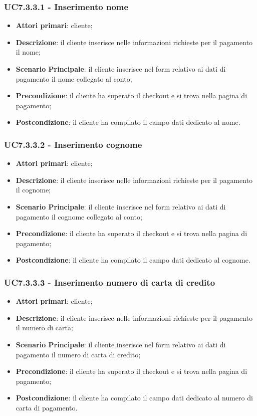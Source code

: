 \subsubsection{UC7.3.3.1 - Inserimento nome}
\begin{itemize}
\item \textbf{Attori primari}: cliente;
\item \textbf{Descrizione}: il cliente inserisce nelle informazioni richieste per il pagamento il nome;
\item \textbf{Scenario Principale}: il cliente inserisce nel form relativo ai dati di pagamento il nome collegato al conto;
\item \textbf{Precondizione}: il cliente ha superato il checkout e si trova nella pagina di pagamento;
\item \textbf{Postcondizione}: il cliente ha compilato il campo dati dedicato al nome.
\end{itemize}

\subsubsection{UC7.3.3.2 - Inserimento cognome}
\begin{itemize}
\item \textbf{Attori primari}: cliente;
\item \textbf{Descrizione}: il cliente inserisce nelle informazioni richieste per il pagamento il cognome;
\item \textbf{Scenario Principale}: il cliente inserisce nel form relativo ai dati di pagamento il cognome collegato al conto;
\item \textbf{Precondizione}: il cliente ha superato il checkout e si trova nella pagina di pagamento;
\item \textbf{Postcondizione}: il cliente ha compilato il campo dati dedicato al cognome.
\end{itemize}

\subsubsection{UC7.3.3.3 - Inserimento numero di carta di credito}
\begin{itemize}
\item \textbf{Attori primari}: cliente;
\item \textbf{Descrizione}: il cliente inserisce nelle informazioni richieste per il pagamento il numero di carta;
\item \textbf{Scenario Principale}: il cliente inserisce nel form relativo ai dati di pagamento il numero di carta di credito;
\item \textbf{Precondizione}: il cliente ha superato il checkout e si trova nella pagina di pagamento;
\item \textbf{Postcondizione}: il cliente ha compilato il campo dati dedicato al numero di carta di pagamento.
\end{itemize}

